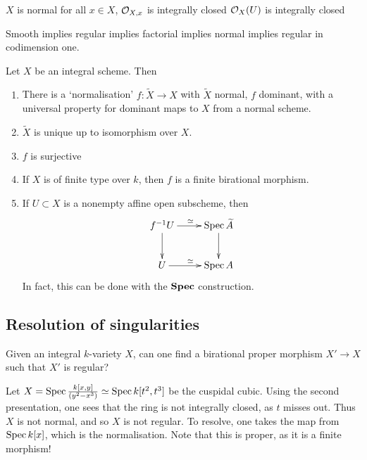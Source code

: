 \documentclass[11pt]{article}
\begin{document}
\begin{Nov8}
\begin{defn*}
\begin{itemise}
\item $X$ is normal \Iff for all $x\in X$, $\mathcal{O}_{X,x}$ is integrally closed \Iff $\mathcal{O}_X(U)$ is integrally closed
\end{itemise}
Smooth implies regular implies factorial implies normal implies regular in codimension one.
\end{defn*}
\begin{thm*}[Normalisation; c.f.\ Ex.\ I.3.17, II.3.17]
Let $X$ be an integral scheme. Then
\begin{enumerate}\squishlist
\item There is a `normalisation' $f:\widetilde{X}\to X$ with $\widetilde{X}$ normal, $f$ dominant, with a universal property for dominant maps to $X$ from a normal scheme.
\item $\widetilde{X}$ is unique up to isomorphism over $X$.
\item $f$ is surjective
\item If $X$ is of finite type over $k$, then $f$ is a finite birational morphism.
\item If $U\subset X$ is a nonempty affine open subscheme, then 
\[\xymatrix{
 \ar[r]^\simeq\ar[d]f^{-1}U& \spec\widetilde{A}\ar[d]\\
 \ar[r]^\simeq U& \spec A\\
}\]
In fact, this can be done with the $\operatorname{\textbf{Spec}}$ construction.
\end{enumerate}
\end{thm*}
\subsection*{Resolution of singularities}
Given an integral $k$-variety $X$, can one find a birational proper morphism $X'\to X$ such that $X'$ is regular?
\begin{exmp*}
Let $X=\operatorname{Spec}\frac{k[x,y]}{(y^2-x^3)}\simeq\operatorname{Spec} k[t^2,t^3]$ be the cuspidal cubic. Using the second presentation, one sees that the ring is not integrally closed, as $t$ misses out. Thus $X$ is not normal, and so $X$ is not regular. To resolve, one takes the map from $\operatorname{Spec} k[x]$, which is the normalisation. Note that this is proper, as it is a finite morphism!
\end{exmp*}

\end{Nov8}
\end{document}
